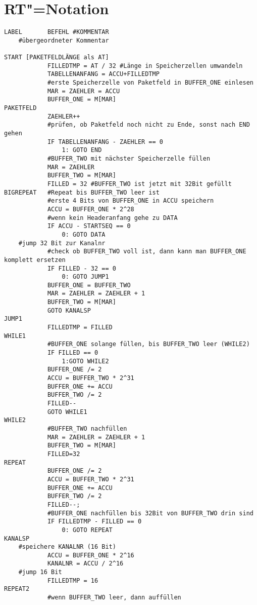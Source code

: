 \chapter{RT"=Notation}
\label{chapter:Anhang-RtNotation}

{\scriptsize\begin{verbatim}
LABEL       BEFEHL #KOMMENTAR
    #übergeordneter Kommentar

START [PAKETFELDLÄNGE als AT]
            FILLEDTMP = AT / 32 #Länge in Speicherzellen umwandeln
            TABELLENANFANG = ACCU+FILLEDTMP
            #erste Speicherzelle von Paketfeld in BUFFER_ONE einlesen
            MAR = ZAEHLER = ACCU
            BUFFER_ONE = M[MAR]
PAKETFELD
            ZAEHLER++
            #prüfen, ob Paketfeld noch nicht zu Ende, sonst nach END gehen
            IF TABELLENANFANG - ZAEHLER == 0
                1: GOTO END
            #BUFFER_TWO mit nächster Speicherzelle füllen
            MAR = ZAEHLER
            BUFFER_TWO = M[MAR]
            FILLED = 32 #BUFFER_TWO ist jetzt mit 32Bit gefüllt
BIGREPEAT   #Repeat bis BUFFER_TWO leer ist
            #erste 4 Bits von BUFFER_ONE in ACCU speichern
            ACCU = BUFFER_ONE * 2^28
            #wenn kein Headeranfang gehe zu DATA
            IF ACCU - STARTSEQ == 0
                0: GOTO DATA
    #jump 32 Bit zur Kanalnr
            #check ob BUFFER_TWO voll ist, dann kann man BUFFER_ONE komplett ersetzen
            IF FILLED - 32 == 0
                0: GOTO JUMP1
            BUFFER_ONE = BUFFER_TWO
            MAR = ZAEHLER = ZAEHLER + 1
            BUFFER_TWO = M[MAR]
            GOTO KANALSP
JUMP1
            FILLEDTMP = FILLED
WHILE1
            #BUFFER_ONE solange füllen, bis BUFFER_TWO leer (WHILE2)
            IF FILLED == 0
                1:GOTO WHILE2
            BUFFER_ONE /= 2
            ACCU = BUFFER_TWO * 2^31
            BUFFER_ONE += ACCU
            BUFFER_TWO /= 2
            FILLED--
            GOTO WHILE1
WHILE2
            #BUFFER_TWO nachfüllen
            MAR = ZAEHLER = ZAEHLER + 1
            BUFFER_TWO = M[MAR]
            FILLED=32
REPEAT
            BUFFER_ONE /= 2
            ACCU = BUFFER_TWO * 2^31
            BUFFER_ONE += ACCU
            BUFFER_TWO /= 2
            FILLED--;
            #BUFFER_ONE nachfüllen bis 32Bit von BUFFER_TWO drin sind
            IF FILLEDTMP - FILLED == 0
                0: GOTO REPEAT
KANALSP
    #speichere KANALNR (16 Bit)
            ACCU = BUFFER_ONE * 2^16
            KANALNR = ACCU / 2^16
    #jump 16 Bit
            FILLEDTMP = 16
REPEAT2
            #wenn BUFFER_TWO leer, dann auffüllen

\end{verbatim}}
